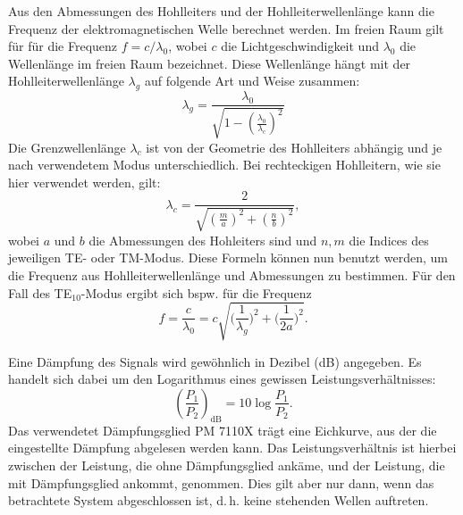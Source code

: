 Aus den Abmessungen des Hohlleiters und der Hohlleiterwellenlänge kann
die Frequenz der elektromagnetischen Welle berechnet werden. Im freien
Raum gilt für für die Frequenz $f = c/\lambda_0$, wobei $c$ die
Lichtgeschwindigkeit und $\lambda_0$ die Wellenlänge im freien Raum
bezeichnet.  Diese Wellenlänge hängt mit der Hohlleiterwellenlänge
$\lambda_g$ auf folgende Art und Weise zusammen:
%
\begin{equation}
  \lambda_g = \frac{\lambda_0}{\sqrt{1 - \left(\frac{\lambda_0}{\lambda_\text{c}}\right)^2}}
\end{equation}
%
Die Grenzwellenlänge $\lambda_c$ ist von der Geometrie des Hohlleiters
abhängig und je nach verwendetem Modus unterschiedlich. Bei rechteckigen
Hohlleitern, wie sie hier verwendet werden, gilt:
\begin{equation}
  \lambda_c = \frac{2}{\sqrt{\left(\frac{m}{a}\right)^2 + \left(\frac{n}{b}\right)^2}},
\end{equation}
%
wobei $a$ und $b$ die Abmessungen des Hohleiters sind und $n, m$ die
Indices des jeweiligen TE- oder TM-Modus.  Diese Formeln können nun
benutzt werden, um die Frequenz aus Hohlleiterwellenlänge und
Abmessungen zu bestimmen. Für den Fall des TE$_{10}$-Modus ergibt sich
bspw. für die Frequenz
%
\begin{equation}
  \label{eq:freq-hohl}
  f = \frac{c}{\lambda_0} = c \sqrt{\Big(\frac{1}{\lambda_g}\Big)^2 + \Big(\frac{1}{2a}\Big)^2}.
\end{equation}

Eine Dämpfung des Signals wird gewöhnlich in Dezibel (dB) angegeben.  Es
handelt sich dabei um den Logarithmus eines gewissen
Leistungsverhältnisses:
%
\begin{equation}
  \left(\frac{P_1}{P_2}\right)_\text{dB} = 10 \log \frac{P_1}{P_2}.
\end{equation}
Das verwendetet Dämpfungsglied PM 7110X trägt eine Eichkurve, aus der
die eingestellte Dämpfung abgelesen werden kann.  Das
Leistungsverhältnis ist hierbei zwischen der Leistung, die ohne
Dämpfungsglied ankäme, und der Leistung, die mit Dämpfungsglied ankommt,
genommen.  Dies gilt aber nur dann, wenn das betrachtete System
abgeschlossen ist, d.\,h. keine stehenden Wellen auftreten.
